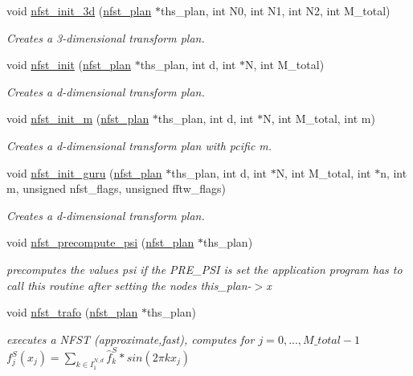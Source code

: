\begin{CompactItemize}
void \hyperlink{group__nfsct_ga17}{nfst\_\-init\_\-3d} (\hyperlink{structnfst__plan}{nfst\_\-plan} $\ast$ths\_\-plan, int N0, int N1, int N2, int M\_\-total)
\begin{CompactList}\small\item\em Creates a 3-dimensional transform plan. \item\end{CompactList}\item 
void \hyperlink{group__nfsct_ga18}{nfst\_\-init} (\hyperlink{structnfst__plan}{nfst\_\-plan} $\ast$ths\_\-plan, int d, int $\ast$N, int M\_\-total)
\begin{CompactList}\small\item\em Creates a d-dimensional transform plan. \item\end{CompactList}\item 
void \hyperlink{group__nfsct_ga19}{nfst\_\-init\_\-m} (\hyperlink{structnfst__plan}{nfst\_\-plan} $\ast$ths\_\-plan, int d, int $\ast$N, int M\_\-total, int m)
\begin{CompactList}\small\item\em Creates a d-dimensional transform plan with pcific m. \item\end{CompactList}\item 
void \hyperlink{group__nfsct_ga20}{nfst\_\-init\_\-guru} (\hyperlink{structnfst__plan}{nfst\_\-plan} $\ast$ths\_\-plan, int d, int $\ast$N, int M\_\-total, int $\ast$n, int m, unsigned nfst\_\-flags, unsigned fftw\_\-flags)
\begin{CompactList}\small\item\em Creates a d-dimensional transform plan. \item\end{CompactList}\item 
void \hyperlink{group__nfsct_ga21}{nfst\_\-precompute\_\-psi} (\hyperlink{structnfst__plan}{nfst\_\-plan} $\ast$ths\_\-plan)
\begin{CompactList}\small\item\em precomputes the values psi if the PRE\_\-PSI is set the application program has to call this routine after setting the nodes this\_\-plan-$>$x \item\end{CompactList}\item 
void \hyperlink{group__nfsct_ga22}{nfst\_\-trafo} (\hyperlink{structnfst__plan}{nfst\_\-plan} $\ast$ths\_\-plan)
\begin{CompactList}\small\item\em executes a NFST (approximate,fast), computes for $j=0,...,M\_total-1$ $f_j^S(x_j) = \sum_{k \in I_1^{N,d}} \hat{f}_k^S * sin(2 \pi k x_j)$ \item\end{CompactList}\item 

\end{CompactItemize}
